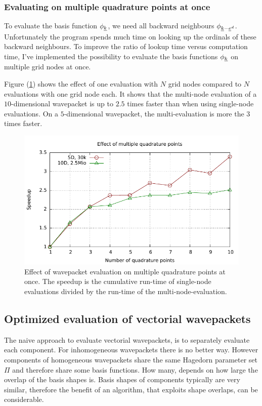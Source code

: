 \documentclass{article}
\begin{document}
\subsubsection{Evaluating on multiple quadrature points at once}

To evaluate the basis function \(\phi_{\underline{k}}\), we need all backward neighbours
\(\phi_{\underline{k}-\underline{e}^d}\).
Unfortunately the program spends much time on looking up the ordinals of these
backward neighbours. To improve the ratio of lookup time versus computation time,
I've implemented the possibility to evaluate the basis functions \(\phi_{\underline{k}}\)
on multiple grid nodes at once.

Figure (\ref{fig:hawp_eval_multiqp}) shows the effect of one
evaluation with \(N\) grid nodes compared to \(N\) evaluations with one
grid node each. It shows that the multi-node evaluation of a \(10\)-dimensional
wavepacket is up to \(2.5\) times faster than when using single-node evaluations.
On a \(5\)-dimensional wavepacket, the multi-evaluation is more the \(3\) times faster.

\begin{figure}[H]
  \centering
  \includegraphics[width=1.0\textwidth]{plots/hawp_eval_multiqp}
  \caption{
    Effect of wavepacket evaluation on multiple quadrature points at once.
    The speedup is the cumulative run-time of single-node evaluations divided by
    the run-time of the multi-node-evaluation.
  }
  \label{fig:hawp_eval_multiqp}
\end{figure}

\subsection{Optimized evaluation of vectorial wavepackets} \label{sec:vector_hawp_eval}
The naive approach to evaluate vectorial wavepackets, is to separately
evaluate each component. For inhomogeneous wavepackets there is
no better way.
However components of homogeneous wavepackets share the same Hagedorn parameter set \(\Pi\)
and therefore share some basis functions. How many, depends on how large the overlap of
the basis shapes is. Basis shapes of components typically are very similar, therefore
the benefit of an algorithm, that exploits shape overlaps, can be considerable.
\end{document}
